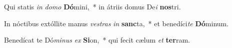 \item Qui statis \textit{in} \textit{do}\textit{mo} \textbf{Dó}mini,~* in átriis domus De\textit{i} \textbf{nos}tri.
\item In nóctibus extóllite manus \textit{ves}\textit{tras} \textit{in} \textbf{sanc}ta,~* et benedíci\textit{te} \textbf{Dó}minum.
\item Benedícat te Dó\textit{mi}\textit{nus} \textit{ex} \textbf{Si}on,~* qui fecit cælum \textit{et} \textbf{ter}ram.
